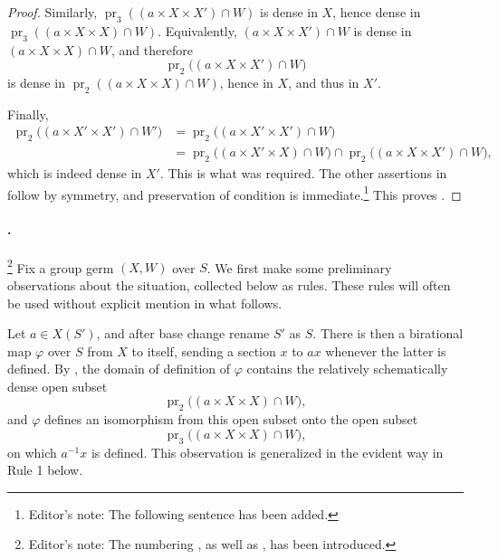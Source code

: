 \begin{proof}
Similarly,
\(\operatorname{pr}_3((a\times X\times X')\cap W)\) is dense in
\(X\), hence dense in
\(\operatorname{pr}_3((a\times X\times X)\cap W)\). Equivalently,
\((a\times X\times X')\cap W\) is dense in
\((a\times X\times X)\cap W\), and therefore
\[
  \operatorname{pr}_2\bigl((a\times X\times X')\cap W\bigr)
\]
is dense in
\(\operatorname{pr}_2((a\times X\times X)\cap W)\), hence in
\(X\), and thus in \(X'\).

Finally,
\[
\begin{aligned}
  \operatorname{pr}_2\bigl((a\times X'\times X')\cap W'\bigr)
  &=
  \operatorname{pr}_2\bigl((a\times X'\times X')\cap W\bigr)\\
  &=
  \operatorname{pr}_2\bigl((a\times X'\times X)\cap W\bigr)
  \cap
  \operatorname{pr}_2\bigl((a\times X\times X')\cap W\bigr),
\end{aligned}
\]
which is indeed dense in \(X'\). This is what was required. The
other assertions in  follow by symmetry, and preservation of
condition  is immediate.\footnote{Editor's note: The
following sentence has been added.} This proves .
\end{proof}

\paragraph{.}
\footnote{Editor's note: The numbering , as well as ,
has been introduced.}
Fix a group germ \((X,W)\) over \(S\). We first make some
preliminary observations about the situation, collected below as
rules. These rules will often be used without explicit mention in
what follows.

Let \(a\in X(S')\), and after base change rename \(S'\) as \(S\).
There is then a birational map \(\varphi\) over \(S\) from \(X\)
to itself, sending a section \(x\) to \(ax\) whenever the latter is
defined. By , the domain of definition of \(\varphi\)
contains the relatively schematically dense open subset
\[
  \operatorname{pr}_2\bigl((a\times X\times X)\cap W\bigr),
\]
and \(\varphi\) defines an isomorphism from this open subset onto
the open subset
\[
  \operatorname{pr}_3\bigl((a\times X\times X)\cap W\bigr),
\]
on which \(a^{-1}x\) is defined. This observation is generalized
in the evident way in Rule 1 below.

